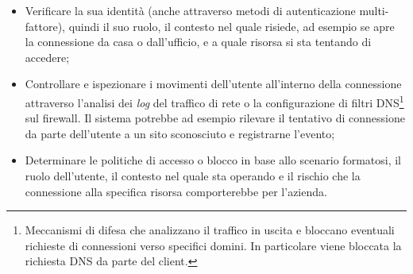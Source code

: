 \documentclass[target=bach,aauheader=]{thud}
\begin{document}
\begin{itemize}
    \item Verificare la sua identità (anche attraverso metodi di autenticazione multi-fattore), quindi il suo ruolo, il contesto nel quale risiede, ad esempio se apre la connessione da casa o dall'ufficio, e a quale risorsa si sta tentando di accedere;
    \item Controllare e ispezionare i movimenti dell'utente all'interno della connessione attraverso l'analisi dei \textit{log} del traffico di rete o la configurazione di filtri DNS\footnote{Meccanismi di difesa che analizzano il traffico in uscita e bloccano eventuali richieste di connessioni verso specifici domini. In particolare viene bloccata la richiesta DNS da parte del client.} sul firewall. Il sistema potrebbe ad esempio rilevare il tentativo di connessione da parte dell'utente a un sito sconosciuto e registrarne l'evento;
    \item Determinare le politiche di accesso o blocco in base allo scenario formatosi, il ruolo dell'utente, il contesto nel quale sta operando e il rischio che la connessione alla specifica risorsa comporterebbe per l'azienda.
\end{itemize}
\end{document}
